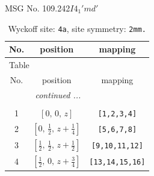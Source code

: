 \documentclass[fleqn,8pt]{jsarticle}
\begin{document}
\setcounter{MaxMatrixCols}{32}

\renewcommand{\tablename}{Table~}
\renewcommand{\figurename}{Figure~}
\begin{center}
\LARGE
MSG No. 109.242\quad$I4_{1}'md'$
\end{center}
\renewcommand{\arraystretch}{1.2}
\begin{longtable}{ccc}
\caption{Wyckoff site: {\tt 4a}, site symmetry: {\tt 2mm.}}
 \\
 \hline \hline
No. & position & mapping \\ \hline \endfirsthead

\multicolumn{2}{l}{\tablename\ \thetable{}} \\
 \hline \hline
No. & position & mapping \\ \hline \endhead

 \hline \hline
\multicolumn{2}{r}{\footnotesize\it continued ...} \\ \endfoot

 \hline \hline
\multicolumn{2}{r}{} \\ \endlastfoot

1 & $\left[ 0,\, 0,\, z \right]$ & {\tt [1,2,3,4]} \\ \hline
2 & $\left[ 0,\, \frac{1}{2},\, z + \frac{1}{4} \right]$ & {\tt [5,6,7,8]} \\ \hline
3 & $\left[ \frac{1}{2},\, \frac{1}{2},\, z + \frac{1}{2} \right]$ & {\tt [9,10,11,12]} \\ \hline
4 & $\left[ \frac{1}{2},\, 0,\, z + \frac{3}{4} \right]$ & {\tt [13,14,15,16]} \\
\end{longtable}
\renewcommand{\arraystretch}{1.2}
\end{document}
